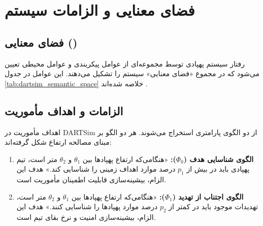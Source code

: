 \documentclass[oneside,openany,a4paper,12pt,draft]{article}
\begin{document}
\section{فضای معنایی و الزامات سیستم}

\subsection{فضای معنایی ()}
رفتار سیستم پهپادی توسط مجموعه‌ای از عوامل پیکربندی و عوامل محیطی تعیین می‌شود که در مجموع «فضای معنایی» سیستم را تشکیل می‌دهند. این عوامل در جدول \ref{tab:dartsim_semantic_space} خلاصه شده‌اند .

\begin{table}[H]
\centering
\caption{فضای معنایی سیستم پهپادی DARTSim}
\label{tab:dartsim_semantic_space}
\end{table}

\subsection{الزامات و اهداف مأموریت}
اهداف مأموریت در DARTSim از دو الگوی پارامتری استخراج می‌شوند. هر دو الگو بر مبنای مصالحه ارتفاع شکل گرفته‌اند:
\begin{enumerate}
    \item \textbf{الگوی شناسایی هدف ($\Phi_0$):} «هنگامی‌که ارتفاع پهپادها بین $\theta_1$ و $\theta_2$ متر است، تیم پهپادی باید در بیش از $p_1$ درصد موارد اهداف زمینی را شناسایی کند.» هدف این الزام، بیشینه‌سازی قابلیت اطمینان مأموریت است.
    \item \textbf{الگوی اجتناب از تهدید ($\Phi_1$):} «هنگامی‌که ارتفاع پهپادها بین $\theta_1$ و $\theta_2$ متر است، تهدیدات موجود باید در کمتر از $p_2$ درصد موارد پهپادها را شناسایی کنند.» هدف این الزام، بیشینه‌سازی امنیت و نرخ بقای تیم است.
\end{enumerate}
\end{document}

